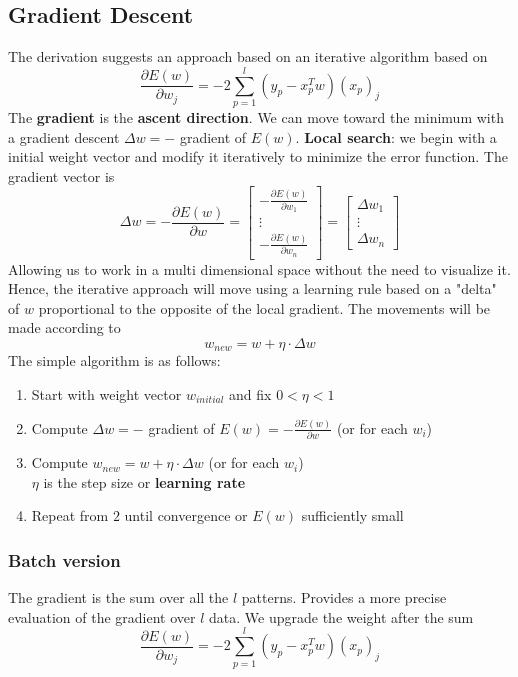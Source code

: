 \documentclass[10pt]{report}
\begin{document}
\subsection{Gradient Descent} The derivation suggests an approach based on an iterative algorithm based on $$\frac{\partial E(w)}{\partial w_j} = -2 \sum_{p=1}^l (y_p - x_p^T w)(x_p)_j$$ The \textbf{gradient} is the \textbf{ascent direction}. We can move toward the minimum with a gradient descent $\Delta w = -$ gradient of $E(w)$. \textbf{Local search}: we begin with a initial weight vector and modify it iteratively to minimize the error function. The gradient vector is
$$\Delta w = -\frac{\partial E(w)}{\partial w} = \left[\begin{array}{c}
-\frac{\partial E(w)}{\partial w_1}\\\vdots\\-\frac{\partial E(w)}{\partial w_n}
\end{array}\right] = \left[\begin{array}{c}
\Delta w_1\\\vdots\\\Delta w_n
\end{array} \right]$$
Allowing us to work in a multi dimensional space without the need to visualize it. Hence, the iterative approach will move using a learning rule based on a "delta" of $w$ proportional to the opposite of the local gradient. The movements will be made according to $$w_{new} = w + \eta\cdot\Delta w$$
The simple algorithm is as follows:
\begin{enumerate}
	\item Start with weight vector $w_{initial}$ and fix $0 < \eta < 1$
	\item Compute $\Delta w = -$ gradient of $E(w) = -\frac{\partial E(w)}{\partial w}$ (or for each $w_i$)
	\item Compute $w_{new} = w + \eta\cdot\Delta w$ (or for each $w_i$)\\
	$\eta$ is the step size or \textbf{learning rate}
	\item Repeat from $2$ until convergence or $E(w)$ sufficiently small
\end{enumerate}
\subsubsection{Batch version} The gradient is the sum over all the $l$ patterns. Provides a more precise evaluation of the gradient over $l$ data. We upgrade the weight after the sum
$$\frac{\partial E(w)}{\partial w_j} = -2 \sum_{p=1}^l (y_p - x_p^T w)(x_p)_j$$
\end{document}
